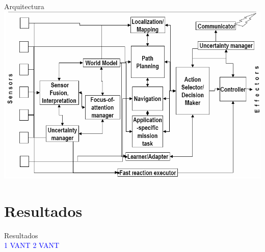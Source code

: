 \documentclass[
  24pt, %
  aspectratio=169, %
]{beamer}
\begin{document}
\begin{frame}{Arquitectura}
\centering
      \includegraphics[width=\linewidth]{robot_arquitectura} %
\end{frame}

\section{Resultados}
\begin{frame}{Resultados}
  \bigskip %
  \centering
  \hfil
  \vspace{2pt}\\
  \textcolor{blue}{1 VANT}
  \hfil
  \textcolor{blue}{2 VANT}
\end{frame}
\end{document}
